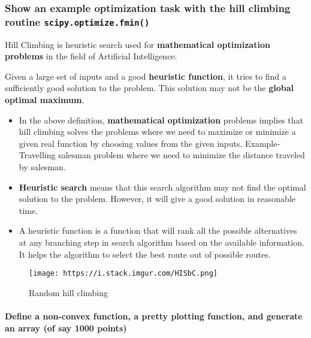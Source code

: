 \documentclass[11pt]{article}
\makeatletter
\def\maxwidth{\ifdim\Gin@nat@width>\linewidth\linewidth
    \else\Gin@nat@width\fi}
\let\Oldincludegraphics\includegraphics
\renewcommand{\includegraphics}[1]{\Oldincludegraphics[width=.8\maxwidth]{#1}}
\providecommand{\tightlist}{%
      \setlength{\itemsep}{0pt}\setlength{\parskip}{0pt}}
\makeatother
\begin{document}
\subsubsection{\texorpdfstring{Show an example optimization task with
the hill climbing routine
\texttt{scipy.optimize.fmin()}}{Show an example optimization task with the hill climbing routine scipy.optimize.fmin()}}\label{show-an-example-optimization-task-with-the-hill-climbing-routine-scipy.optimize.fmin}

Hill Climbing is heuristic search used for \textbf{mathematical
optimization problems} in the field of Artificial Intelligence.

Given a large set of inputs and a good \textbf{heuristic function}, it
tries to find a sufficiently good solution to the problem. This solution
may not be the \textbf{global optimal maximum}.

\begin{itemize}
\tightlist
\item
  In the above definition, \textbf{mathematical optimization} problems
  implies that hill climbing solves the problems where we need to
  maximize or minimize a given real function by choosing values from the
  given inputs. Example-Travelling salesman problem where we need to
  minimize the distance traveled by salesman.
\item
  \textbf{Heuristic search} means that this search algorithm may not
  find the optimal solution to the problem. However, it will give a good
  solution in reasonable time.
\item
  A heuristic function is a function that will rank all the possible
  alternatives at any branching step in search algorithm based on the
  available information. It helps the algorithm to select the best route
  out of possible routes.
\end{itemize}

\begin{figure}
\centering
\texttt{[image: https://i.stack.imgur.com/HISbC.png]}
\caption{Random hill climbing}
\end{figure}

    \paragraph{Define a non-convex function, a pretty plotting function, and
generate an array (of say 1000
points)}\label{define-a-non-convex-function-a-pretty-plotting-function-and-generate-an-array-of-say-1000-points}
\end{document}
